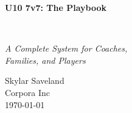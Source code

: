 
\clearpage
\vspace*{1.5in}
\begin{center}
  \begin{minipage}{\textwidth}
    \centering
    \Huge\bfseries
    \linespread{1.25}\selectfont
  U10 7v7: The Playbook
  \end{minipage}
  \\[3em]
  {\Large\itshape\linespread{1.3}\selectfont
  A Complete System for Coaches, \\ Families, and Players\par}
  \vfill
  {\large Skylar Saveland}
  \\[1em]
  {\large Corpora Inc}
  \\[1em]
  {\large \today}
\end{center}
\clearpage
